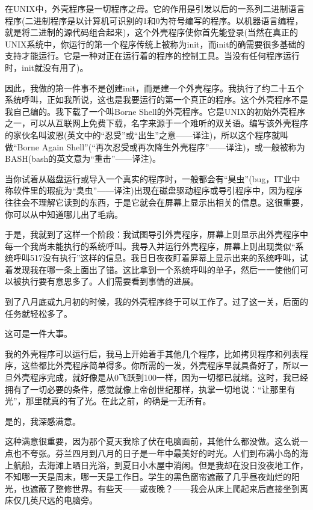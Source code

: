 在UNIX中，外壳程序是一切程序之母。它的作用是引发以后的一系列二进制语言程序(二进制程序是以计算机可识别的1和0为符号编写的程序。以机器语言编程，就是将二进制的源代码组合起来)，这个外壳程序使你首先能登录(当然在真正的UNIX系统中，你运行的第一个程序传统上被称为init，而init的确需要很多基础的支持才能运行。它是一种对正在运行着的程序的控制工具。当没有任何程序运行时，init就没有用了)。

因此，我做的第一件事不是创建init，而是建一个外壳程序。我执行了约二十五个系统呼叫，正如我所说，这也是我要运行的第一个真正的程序。这个外壳程序不是我自己编的。我下载了一个叫Borne Shell的外壳程序。它是UNIX的初始外壳程序之一，可以从互联网上免费下载，名字来源于一个难听的双关语。编写该外壳程序的家伙名叫波恩(英文中的“忍受”或“出生”之意——译注)，所以这个程序就叫做“Borne Again Shell”(“再次忍受或再次降生外壳程序”——译注)，或一般被称为BASH(bash的英文意为“重击”——译注)。

当你试着从磁盘运行或导入一个真实的程序时，一般都会有“臭虫”(bug，IT业中称软件里的瑕疵为“臭虫”——译注)出现在磁盘驱动程序或导引程序中，因为程序往往会不理解它读到的东西，于是它就会在屏幕上显示出相关的信息。这很重要，你可以从中知道哪儿出了毛病。

于是，我就到了这样一个阶段：我试图导引外壳程序，屏幕上则显示出外壳程序中每一个我尚未能执行的系统呼叫。我导入并运行外壳程序，屏幕上则出现类似“系统呼叫517没有执行”这样的信息。我日日夜夜盯着屏幕上显示出来的系统呼叫，试着发现我在哪一条上面出了错。这比拿到一个系统呼叫的单子，然后一一使他们可以被执行要有意思多了。人们需要看到事情的进展。

到了八月底或九月初的时候，我的外壳程序终于可以工作了。过了这一关，后面的任务就轻松多了。

 

这可是一件大事。

我的外壳程序可以运行后，我马上开始着手其他几个程序，比如拷贝程序和列表程序，这些都比外壳程序简单得多。你所需的一发，外壳程序早就具备好了，所以一旦外壳程序完成，就好像是从0飞跃到100一样，因为一切都已就绪。这时，我已经拥有了一切必要的条件，感觉就像上帝创世纪那样，执掌一切地说：“让那里有光”，那里就真的有了光。在此之前，的确是一无所有。

是的，我深感满意。

这种满意很重要，因为那个夏天我除了伏在电脑面前，其他什么都没做。这么说一点也不夸张。芬兰四月到八月的日子是一年中最美好的时光。人们到布满小岛的海上航船，去海滩上晒日光浴，到夏日小木屋中消闲。但是我却在没日没夜地工作，不知哪一天是周末，哪一天是工作日。学生的黑色窗帘遮蔽了几乎昼夜灿烂的阳光，也遮蔽了整修世界。有些天——或夜晚？——我会从床上爬起来后直接坐到离床仅几英尺远的电脑旁。

